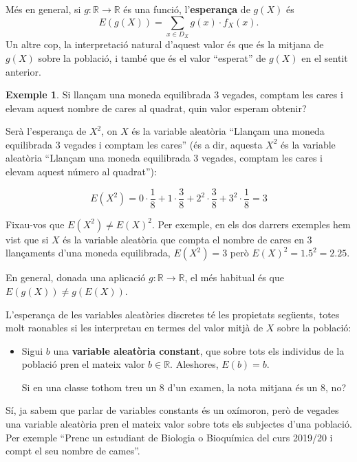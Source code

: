 \documentclass[
]{book}
\newenvironment{rmdblock}[1]
  {
  \begin{itemize}
  \renewcommand{\labelitemi}{
    \raisebox{-.7\height}[0pt][0pt]{
      {\setkeys{Gin}{width=3em,keepaspectratio}\texttt{[image: Bioestadística-II\_files/figure-html/\#1]}}
    }
  }
  \setlength{\fboxsep}{1em}
  \begin{kframe}
  \item
  }
  {
  \end{kframe}
  \end{itemize}
  }
\newenvironment{rmdcaution}
  {\begin{rmdblock}{caution}}
  {\end{rmdblock}}
\theoremstyle{definition}
\theoremstyle{definition}
\newtheorem{example}{Exemple}[chapter]
\theoremstyle{definition}
\theoremstyle{remark}
\begin{document}
Més en general, si \(g:\mathbb{R}\to \mathbb{R}\) és una funció, l'\textbf{esperança} de \(g(X)\) és
\[
E(g(X))=\sum_{x\in D_X} g(x)\cdot f_X(x).
\]
Un altre cop, la interpretació natural d'aquest valor és que és la mitjana de \(g(X)\) sobre la població, i també que és el valor ``esperat'' de \(g(X)\) en el sentit anterior.

\begin{example}
\protect\hypertarget{exm:unnamed-chunk-16}{}{\label{exm:unnamed-chunk-16} }Si llançam una moneda equilibrada 3 vegades, comptam les cares i elevam aquest nombre de cares al quadrat, quin valor esperam obtenir?
\end{example}

Serà l'esperança de \(X^2\), on \(X\) és la variable aleatòria ``Llançam una moneda equilibrada 3 vegades i comptam les cares'' (és a dir, aquesta \(X^2\) és la variable aleatòria ``Llançam una moneda equilibrada 3 vegades, comptam les cares i elevam aquest número al quadrat''):

\[
E(X^2)= 0\cdot \frac{1}{8}+1\cdot \frac{3}{8}+2^2\cdot \frac{3}{8}+3^2\cdot \frac{1}{8}=3
\]

\begin{rmdcaution}
Fixau-vos que \(E(X^2) \neq E(X)^2\). Per exemple, en els dos darrers exemples hem vist que si \(X\) és la variable aleatòria que compta el nombre de cares en 3 llançaments d'una moneda equilibrada, \(E(X^2)=3\) però \(E(X)^2=1.5^2=2.25\).

En general, donada una aplicació \(g:\mathbb{R}\to \mathbb{R}\), el més habitual és que \(E(g(X))\neq g(E(X))\).
\end{rmdcaution}

L'esperança de les variables aleatòries discretes té les propietats següents, totes molt raonables si les interpretau en termes del valor mitjà de \(X\) sobre la població:

\begin{itemize}
\item
  Sigui \(b\) una \textbf{variable aleatòria constant}, que sobre tots els individus de la població pren el mateix valor \(b\in \mathbb{R}\). Aleshores, \(E(b)=b\).

  Si en una classe tothom treu un 8 d'un examen, la nota mitjana és un 8, no?
\end{itemize}

\begin{rmdromans}
Sí, ja sabem que parlar de variables constants és un oxímoron, però de vegades una variable aleatòria pren el mateix valor sobre tots els subjectes d'una població. Per exemple ``Prenc un estudiant de Biologia o Bioquímica del curs 2019/20 i compt el seu nombre de cames''.
\end{rmdromans}
\end{document}
